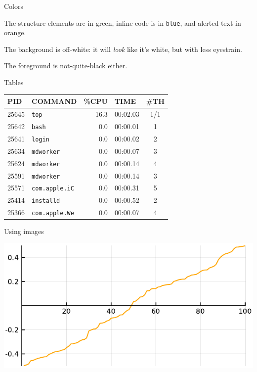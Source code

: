 \documentclass[12pt, compress, aspectratio=1610]{beamer}
\let\OldTexttt\texttt
\renewcommand{\texttt}[1]{\OldTexttt{\color{codecolor}#1}}
\begin{document}
\begin{frame}[fragile]{Colors}

The structure elements are in green, inline code is in \texttt{blue},
and alerted text in \alert{orange}.

The background is off-white: it will \emph{look} like it's white, but
with less eyestrain.

The foreground is not-quite-black either.

\end{frame}

\begin{frame}[fragile]{Tables}

\begin{longtable}[]{@{}llrlc@{}}
\toprule
PID & COMMAND & \%CPU & TIME & \#TH\tabularnewline
\midrule
\endhead
25645 & \texttt{top} & 16.3 & 00:02.03 & 1/1\tabularnewline
25642 & \texttt{bash} & 0.0 & 00:00.01 & 1\tabularnewline
25641 & \texttt{login} & 0.0 & 00:00.02 & 2\tabularnewline
25634 & \texttt{mdworker} & 0.0 & 00:00.07 & 3\tabularnewline
25624 & \texttt{mdworker} & 0.0 & 00:00.14 & 4\tabularnewline
25591 & \texttt{mdworker} & 0.0 & 00:00.14 & 3\tabularnewline
25571 & \texttt{com.apple.iC} & 0.0 & 00:00.31 & 5\tabularnewline
25414 & \texttt{installd} & 0.0 & 00:00.52 & 2\tabularnewline
25366 & \texttt{com.apple.We} & 0.0 & 00:00.07 & 4\tabularnewline
\bottomrule
\end{longtable}

\end{frame}

\begin{frame}{Using images}

\includegraphics[width=\textwidth]{figures/density.pdf}

\end{frame}
\end{document}
